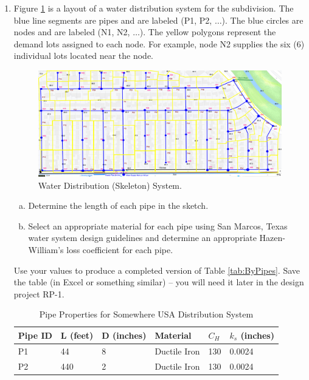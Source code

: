 \documentclass[12pt]{article}
\begin{document}
\begin{enumerate}
\item Figure \ref{fig:water_network_layout} is a layout of a water distribution system for the subdivision.   
The blue line segments are pipes and are labeled (P1, P2, $\dots$).   
The blue circles are nodes and are labeled (N1, N2, $\dots$).
The yellow polygons represent the demand lots assigned to each node.  
For example, node N2 supplies the six (6) individual lots located near the node.
\begin{figure}[ht!] %
   \centering
   \includegraphics[width=6.5in]{SomewhereClipNodes.jpg} 
   \caption{Water Distribution (Skeleton) System.}
   \label{fig:water_network_layout}
\end{figure}
\begin{enumerate}[a)]
\item Determine the length of each pipe in the sketch.
\item Select an appropriate material for each pipe using San Marcos, Texas water system design guidelines and determine an appropriate Hazen-William's loss coefficient for each pipe.
\end{enumerate}
Use your values to produce a completed version of Table \ref{tab:ByPipes}.
Save the table (in Excel or something similar) -- you will need it later in the design project RP-1.
\begin{table}[h!]
   \centering
   \caption{Pipe Properties for Somewhere USA Distribution System}
   \begin{tabular}{p{1in}p{1in}p{1in}p{1in}p{1in}p{1in}} %
Pipe ID & L (feet) & D (inches) & Material & $C_H$ & $k_s$ (inches) \\
\hline
\hline
P1 & 44 & 8 & Ductile Iron & 130 & 0.0024 \\
P2 & 440 & 2 &Ductile Iron & 130 & 0.0024 \\

\end{tabular}
\end{table}
\end{enumerate}
\end{document}
